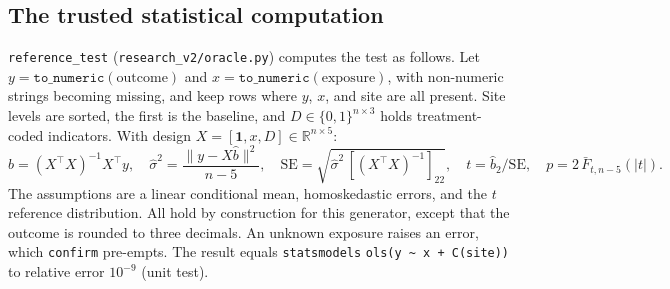 \subsection{The trusted statistical computation}
\label{app:trusted-ols}
\texttt{reference\_test} (\texttt{research\_v2/oracle.py}) computes the
test as follows. Let $y=\texttt{to\_numeric}(\text{outcome})$ and
$x=\texttt{to\_numeric}(\text{exposure})$, with non-numeric strings becoming
missing, and keep rows where $y$, $x$, and site are all present. Site levels
are sorted, the first is the baseline, and
$D\in\{0,1\}^{n\times3}$ holds treatment-coded indicators. With design
$X=[\mathbf{1},x,D]\in\mathbb{R}^{n\times5}$:
\begin{equation}
\hat b=(X^\top X)^{-1}X^\top y,\quad \hat\sigma^2=\frac{\|y-X\hat b\|^2}{n-5},\quad
\mathrm{SE}=\sqrt{\hat\sigma^2\,[(X^\top X)^{-1}]_{22}},\quad t=\hat b_2/\mathrm{SE},\quad p=2\,\bar F_{t,n-5}(|t|).
\end{equation}
The assumptions are a linear conditional mean, homoskedastic errors, and the
$t$ reference distribution. All hold by construction for this generator,
except that the outcome is rounded to three decimals. An unknown exposure
raises an error, which \texttt{confirm} pre-empts. The result equals
\texttt{statsmodels} \texttt{ols(y\,\textasciitilde\,x\,+\,C(site))} to
relative error $10^{-9}$ (unit test).

